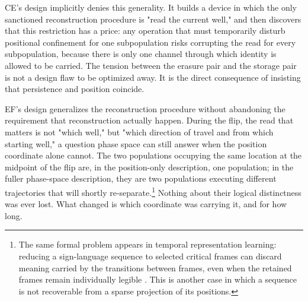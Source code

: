 \documentclass[11pt]{article}
\begin{document}
CE's design implicitly denies this generality. It builds a device in which the only sanctioned reconstruction procedure is "read the current well," and then discovers that this restriction has a price: any operation that must temporarily disturb positional confinement for one subpopulation risks corrupting the read for every subpopulation, because there is only one channel through which identity is allowed to be carried. The tension between the erasure pair and the storage pair is not a design flaw to be optimized away. It is the direct consequence of insisting that persistence and position coincide.

EF's design generalizes the reconstruction procedure without abandoning the requirement that reconstruction actually happen. During the flip, the read that matters is not "which well," but "which direction of travel and from which starting well," a question phase space can still answer when the position coordinate alone cannot. The two populations occupying the same location at the midpoint of the flip are, in the position-only description, one population; in the fuller phase-space description, they are two populations executing different trajectories that will shortly re-separate.\footnote{The same formal problem appears in temporal representation learning: reducing a sign-language sequence to selected critical frames can discard meaning carried by the transitions between frames, even when the retained frames remain individually legible \cite{SunMengNgo2026}. This is another case in which a sequence is not recoverable from a sparse projection of its positions.} Nothing about their logical distinctness was ever lost. What changed is which coordinate was carrying it, and for how long.
\end{document}
